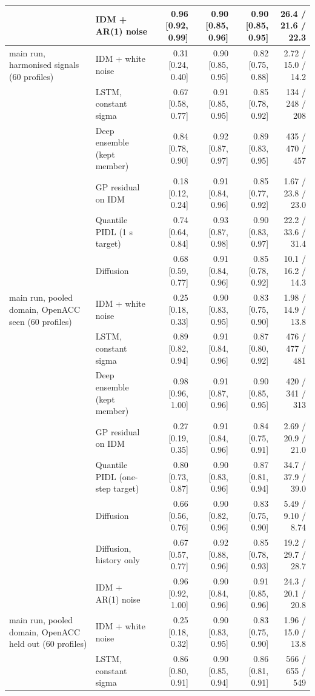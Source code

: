 \begin{longtable}{llrrrr}
 & IDM + AR(1) noise & 0.96 [0.92, 0.99] & 0.90 [0.85, 0.96] & 0.90 [0.85, 0.95] & 26.4 / 21.6 / 22.3 \\
\midrule
main run, harmonised signals (60 profiles) & IDM + white noise & 0.31 [0.24, 0.40] & 0.90 [0.85, 0.95] & 0.82 [0.75, 0.88] & 2.72 / 15.0 / 14.2 \\
 & LSTM, constant sigma & 0.67 [0.58, 0.77] & 0.91 [0.85, 0.95] & 0.85 [0.78, 0.92] & 134 / 248 / 208 \\
 & Deep ensemble (kept member) & 0.84 [0.78, 0.90] & 0.92 [0.87, 0.97] & 0.89 [0.83, 0.95] & 435 / 470 / 457 \\
 & GP residual on IDM & 0.18 [0.12, 0.24] & 0.91 [0.84, 0.96] & 0.85 [0.77, 0.92] & 1.67 / 23.8 / 23.0 \\
 & Quantile PIDL (1 s target) & 0.74 [0.64, 0.84] & 0.93 [0.87, 0.98] & 0.90 [0.83, 0.97] & 22.2 / 33.6 / 31.4 \\
 & Diffusion & 0.68 [0.59, 0.77] & 0.91 [0.84, 0.96] & 0.85 [0.78, 0.92] & 10.1 / 16.2 / 14.3 \\
\midrule
main run, pooled domain, OpenACC seen (60 profiles) & IDM + white noise & 0.25 [0.18, 0.33] & 0.90 [0.83, 0.95] & 0.83 [0.75, 0.90] & 1.98 / 14.9 / 13.8 \\
 & LSTM, constant sigma & 0.89 [0.82, 0.94] & 0.91 [0.84, 0.96] & 0.87 [0.80, 0.92] & 476 / 477 / 481 \\
 & Deep ensemble (kept member) & 0.98 [0.96, 1.00] & 0.91 [0.87, 0.96] & 0.90 [0.85, 0.95] & 420 / 341 / 313 \\
 & GP residual on IDM & 0.27 [0.19, 0.35] & 0.91 [0.84, 0.96] & 0.84 [0.75, 0.91] & 2.69 / 20.9 / 21.0 \\
 & Quantile PIDL (one-step target) & 0.80 [0.73, 0.87] & 0.90 [0.83, 0.96] & 0.87 [0.81, 0.94] & 34.7 / 37.9 / 39.0 \\
 & Diffusion & 0.66 [0.56, 0.76] & 0.90 [0.82, 0.96] & 0.83 [0.75, 0.90] & 5.49 / 9.10 / 8.74 \\
 & Diffusion, history only & 0.67 [0.57, 0.77] & 0.92 [0.88, 0.96] & 0.85 [0.78, 0.93] & 19.2 / 29.7 / 28.7 \\
 & IDM + AR(1) noise & 0.96 [0.92, 1.00] & 0.90 [0.84, 0.96] & 0.91 [0.85, 0.96] & 24.3 / 20.1 / 20.8 \\
\midrule
main run, pooled domain, OpenACC held out (60 profiles) & IDM + white noise & 0.25 [0.18, 0.32] & 0.90 [0.83, 0.95] & 0.83 [0.75, 0.90] & 1.96 / 15.0 / 13.8 \\
 & LSTM, constant sigma & 0.86 [0.80, 0.91] & 0.90 [0.85, 0.94] & 0.86 [0.81, 0.91] & 566 / 655 / 549 \\

\end{longtable}
